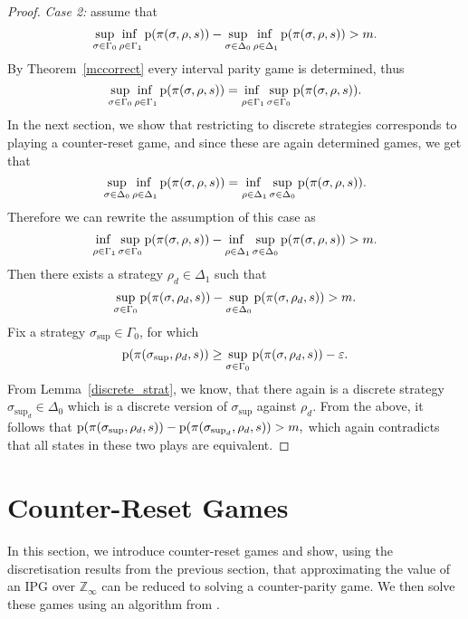 \documentclass[fleqn,envcountsame]{LMCS}
\newcommand{\Zinf}{\ensuremath{\mathbb{Z}_{\infty}}}
\begin{document}
\begin{proof}
\emph{Case 2:} assume that \[\adjustlimits\sup_{\sigma \in \Gamma_0} \inf_{\rho \in \Gamma_1}
      \pay(\pi(\sigma, \rho,s)) - \adjustlimits\sup_{\sigma \in \Delta_0} \inf_{\rho \in \Delta_1}
      \pay(\pi(\sigma, \rho,s)) > m.\] 
By Theorem~\ref{mccorrect} every interval parity game is determined, thus
\[ \adjustlimits \sup_{\sigma \in \Gamma_0} \inf_{\rho \in \Gamma_1}
  \pay(\pi(\sigma, \rho,s)) = 
\adjustlimits \inf_{\rho \in \Gamma_1} \sup_{\sigma \in \Gamma_0}
    \pay(\pi(\sigma, \rho,s)). \]
In the next section, we show that restricting to discrete strategies
corresponds to playing a counter-reset game, and since these are again
determined games, we get that
\[ \adjustlimits \sup_{\sigma \in \Delta_0} \inf_{\rho \in \Delta_1}
  \pay(\pi(\sigma, \rho,s)) = 
\adjustlimits \inf_{\rho \in \Delta_1} \sup_{\sigma \in \Delta_0}
    \pay(\pi(\sigma, \rho,s)). \]
Therefore we can rewrite the assumption of this case as
\[\adjustlimits \inf_{\rho \in \Gamma_1} \sup_{\sigma \in \Gamma_0}
    \pay(\pi(\sigma, \rho,s)) - 
    \adjustlimits \inf_{\rho \in \Delta_1} \sup_{\sigma \in \Delta_0}
      \pay(\pi(\sigma, \rho,s)) > m.\]
Then there exists a strategy $\rho_d \in \Delta_1$ such that 
\[ \sup_{\sigma \in \Gamma_0} \mathrm{p}(\pi(\sigma, \rho_d, s)) -
   \sup_{\sigma \in \Delta_0} \mathrm{p}(\pi(\sigma, \rho_d, s)) > m. \] 
Fix a strategy $\sigma_{\sup} \in \Gamma_0$, for which 
\[ \mathrm{p}(\pi(\sigma_{\sup}, \rho_d, s)) \geq
   \sup_{\sigma \in \Gamma_0} \mathrm{p}(\pi(\sigma, \rho_d, s)) - \varepsilon.\]
From Lemma~\ref{discrete_strat}, we know, that there again is a discrete
strategy $\sigma_{\sup_d} \in \Delta_0$ which is a discrete version
of $\sigma_{\sup}$ against $\rho_d$. From the above, it follows that 
$\mathrm{p}(\pi(\sigma_{\sup}, \rho_d, s))- \mathrm{p}(\pi(\sigma_{\sup_d}, \rho_d,s)) > m,$
which again contradicts that all states in these two plays are equivalent.
\end{proof}


\section{Counter-Reset Games} \label{sec_pushdown}

In this section, we introduce counter-reset games and show,
using the discretisation results from the previous section, 
that approximating the value of an IPG over $\Zinf$ can be
reduced to solving a counter-parity game. We then solve these
games using an algorithm from \cite{BKL12}.
\end{document}
